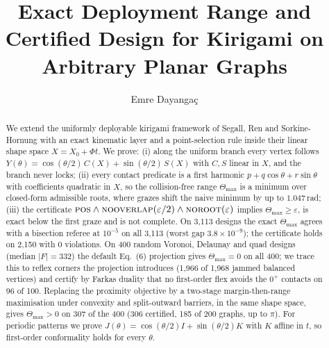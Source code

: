 \documentclass[sigconf,screen]{acmart}
\begin{document}
\title{Exact Deployment Range and Certified Design for Kirigami on Arbitrary Planar Graphs}

\author{Emre Dayanga\c{c}}

\begin{abstract}
We extend the uniformly deployable kirigami framework of Segall, Ren and
Sorkine-Hornung with an exact kinematic layer and a point-selection rule inside
their linear shape space $X=X_0+\Phi t$. We prove: (i) along the uniform branch
every vertex follows $Y(\theta)=\cos(\theta/2)\,C(X)+\sin(\theta/2)\,S(X)$ with
$C,S$ linear in $X$, and the branch never locks; (ii) every contact predicate is
a first harmonic $p+q\cos\theta+r\sin\theta$ with coefficients quadratic in $X$,
so the collision-free range $\Theta_{\max}$ is a minimum over closed-form
admissible roots, where grazes shift the naive minimum by up to $1.047$\,rad;
(iii) the certificate $\textsc{pos}\wedge\textsc{nooverlap}(\varepsilon/2)\wedge
\textsc{noroot}(\varepsilon)$ implies $\Theta_{\max}\ge\varepsilon$, is exact
below the first graze and is not complete. On 3{,}113 designs the exact
$\Theta_{\max}$ agrees with a bisection referee at $10^{-5}$ on all 3{,}113
(worst gap $3.8\times10^{-9}$); the certificate holds on 2{,}150 with 0
violations. On 400 random Voronoi, Delaunay and quad designs (median $|F|=332$)
the default Eq.~(6) projection gives $\Theta_{\max}=0$ on all 400; we trace this
to reflex corners the projection introduces (1{,}966 of 1{,}968 jammed balanced
vertices) and certify by Farkas duality that no first-order flex avoids the
$0^{+}$ contacts on 96 of 100. Replacing the proximity objective by a two-stage
margin-then-range maximisation under convexity and split-outward barriers, in the
same shape space, gives $\Theta_{\max}>0$ on 307 of the 400 (306 certified, 185 of
200 graphs, up to $\pi$). For periodic patterns we prove
$J(\theta)=\cos(\theta/2)I+\sin(\theta/2)K$ with $K$ affine in $t$, so
first-order conformality holds for every $\theta$.
\end{abstract}

\end{document}
